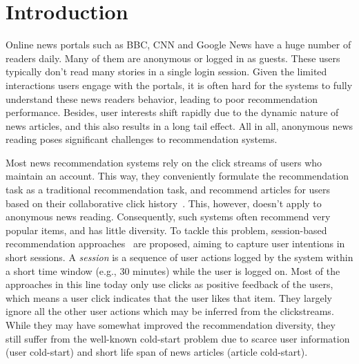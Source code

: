 \section{Introduction}
Online news portals such as BBC, CNN and Google News have a huge number 
of readers daily. Many of them are anonymous or logged in as guests. 
These users typically don't read many stories in a single login session.
Given the limited interactions users engage with the portals, it is often 
hard for the systems to fully understand these news readers behavior, leading
to poor recommendation performance. 
Besides, user interests 
shift rapidly due to the dynamic nature of news articles, and this also 
results in a long tail effect. 
All in all, anonymous news reading
poses significant challenges to recommendation systems. 

Most news recommendation systems rely on the click streams of 
users who maintain an account. This way, they conveniently formulate 
the recommendation task as a traditional recommendation task, 
and recommend articles for users based on their collaborative 
click history~\cite{wang2018dkn, zhu2019dan}. This, however, doesn't 
apply to anonymous news reading. 
Consequently, such systems often recommend very popular items,
and has little diversity. To tackle this problem, session-based recommendation 
approaches~\cite{sottocornola2018session, garg2019sequence, xu2019time} 
are proposed, aiming to capture user intentions in short sessions. 
A \textit{session} is a sequence of user actions logged by the system
within a short time window (e.g., 30 minutes) while the user is logged on. 
Most of the approaches in this line today 
only use clicks as positive feedback of the users, which means
a user click indicates that the user likes that item. They largely ignore
all the other user actions which may be inferred from the clickstreams. 
While they may have somewhat improved the recommendation diversity,
they still suffer from the well-known cold-start problem due to
scarce user information (user cold-start) and short life span of 
news articles (article cold-start). 

